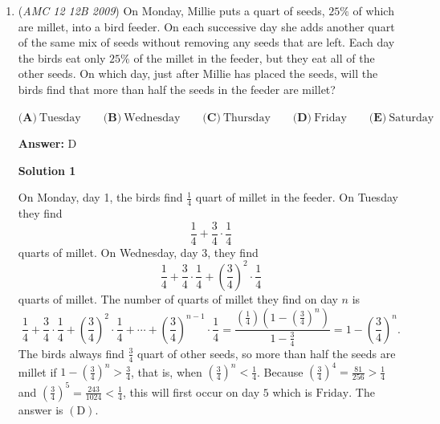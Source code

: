 \begin{enumerate}
 



\textbf{Solution 2}

The required fraction is the number of correct times divided by the total times. There are 60 minutes in an hour and 12 hours on a clock, so there are 720 total times.

 We count the correct times directly; let a correct time be $x:yz$, where $x$ is a number from 1 to 12 and $y$ and $z$ are digits, where $y<6$. There are 8 values of $x$ that will display the correct time: 2, 3, 4, 5, 6, 7, 8, and 9. There are five values of $y$ that will display the correct time: 0, 2, 3, 4, and 5. There are nine values of $z$ that will display the correct time: 0, 2, 3, 4, 5, 6, 7, 8, and 9. Therefore there are $8\cdot 5\cdot 9=40\cdot 9=360$ correct times.

 Therefore the required fraction is $\frac{360}{720}=\frac{1}{2}\Rightarrow \boxed{\mathrm{(A)}}$.

 


 


	\item (\textit{AMC 12 12B 2009}) On Monday, Millie puts a quart of seeds, $25\%$ of which are millet, into a bird feeder.  On each successive day she adds another quart of the same mix of seeds without removing any seeds that are left.  Each day the birds eat only $25\%$ of the millet in the feeder, but they eat all of the other seeds.  On which day, just after Millie has placed the seeds, will the birds find that more than half the seeds in the feeder are millet?


 $\textbf{(A)}\ \text{Tuesday}\qquad \textbf{(B)}\ \text{Wednesday}\qquad \textbf{(C)}\ \text{Thursday} \qquad \textbf{(D)}\ \text{Friday}\qquad \textbf{(E)}\ \text{Saturday}$

 \textbf{Answer: }D



\textbf{Solution 1}

On Monday, day 1, the birds find $\frac 14$ quart of millet in the feeder.  On Tuesday they find
 \[\frac 14 + \frac 34 \cdot \frac 14\]quarts of millet.  On Wednesday, day 3, they find
 \[\frac 14 + \frac 34 \cdot \frac 14 + \left(\frac34\right)^2 \cdot \frac 14\]quarts of millet.  The number of quarts of millet they find on day $n$ is
 \[\frac 14 + \frac 34 \cdot \frac 14 + \left(\frac34\right)^2 \cdot \frac 14 + \cdots + \left(\frac 34\right)^{n-1} \cdot \frac 14 = \frac {(\frac 14)(1 - (\frac 34)^n)}{1 - \frac 34} = 1 - \left(\frac 34\right)^n .\]The birds always find $\frac 34$ quart of other seeds, so more than half the seeds are millet if $1 - \left(\frac 34\right)^n > \frac 34$, that is, when $\left(\frac 34\right)^n < \frac 14$.  Because $\left(\frac 34\right)^4 = \frac {81}{256} > \frac 14$ and $\left(\frac 34\right)^5 = \frac {243}{1024} < \frac 14$, this will first occur on day $5$ which is $\boxed {\text{Friday}}$. The answer is $\mathrm{(D)}$.


\end{enumerate}

